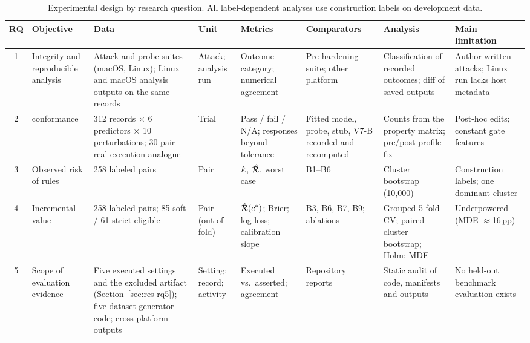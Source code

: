 \begin{table}[!t]
\caption{Experimental design by research question. All label-dependent analyses use construction labels on development data.}
\label{tab:design}
\centering
\scriptsize
\setlength{\tabcolsep}{2.8pt}
\begin{tabular}{|c|L{2.3cm}|L{2.5cm}|L{1.5cm}|L{2.4cm}|L{2.2cm}|L{2.6cm}|L{1.9cm}|}
\hline
RQ & Objective & Data & Unit & Metrics & Comparators & Analysis & Main limitation \\
 & Integrity and reproducible analysis & Attack and probe suites (macOS, Linux); Linux and macOS analysis outputs on the same records & Attack; analysis run & Outcome category; numerical agreement & Pre-hardening suite; other platform & Classification of recorded outcomes; diff of saved outputs & Author-written attacks; Linux run lacks host metadata \\
2 & \ers{} conformance & 312 records $\times$ 6 predictors $\times$ 10 perturbations; 30-pair real-execution analogue & Trial & Pass / fail / N/A; responses beyond tolerance & Fitted model, probe, stub, V7-B recorded and recomputed & Counts from the property matrix; pre/post profile fix & Post-hoc edits; constant gate features \\
3 & Observed risk of rules & 258 labeled pairs & Pair & $\hat{\kappa}$, $\hat{\mathcal{R}}$, worst case & B1--B6 & Cluster bootstrap (10,000) & Construction labels; one dominant cluster \\
4 & Incremental value & 258 labeled pairs; 85 soft / 61 strict eligible & Pair (out-of-fold) & $\hat{\mathcal{R}}(c^\ast)$; Brier; log loss; calibration slope & B3, B6, B7, B9; ablations & Grouped 5-fold CV; paired cluster bootstrap; Holm; MDE & Underpowered (MDE $\approx$16\,pp) \\
5 & Scope of evaluation evidence & Five executed settings and the excluded artifact (Section~\ref{sec:res-rq5}); five-dataset generator code; cross-platform outputs & Setting; record; activity & Executed vs.\ asserted; agreement & Repository reports & Static audit of code, manifests and outputs & No held-out benchmark evaluation exists \\
\hline
\end{tabular}
\end{table}
